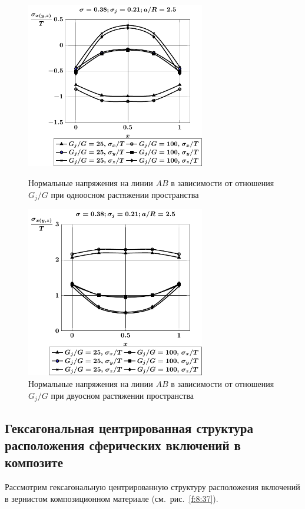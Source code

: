 \begin{figure}[h!]
\centering\footnotesize
\parbox[b]{7.5cm}{\centering\includegraphics[width=7.8cm]{inc9-g-a25-d95-t1.pdf}
\caption{Нормальные напряжения на линии  $AB$ в зависимости от отношения $G_j/G$ при одноосном растяжении пространства
\label{f:8:70}}}\hfil\hfil
\parbox[b]{7.5cm}{\centering\includegraphics[width=7.8cm]{inc9-g-a25-d95-t2.pdf}
\caption{Нормальные напряжения на линии  $AB$ в зависимости от отношения $G_j/G$ при двуосном растяжении пространства
\label{f:8:71}}}
\end{figure}

\subsection{Гексагональная центрированная структура расположения сферических включений в композите}

Рассмотрим гексагональную центрированную структуру расположения включений в зернистом композиционном материале (см.~рис.~\ref{f:8:37}).

